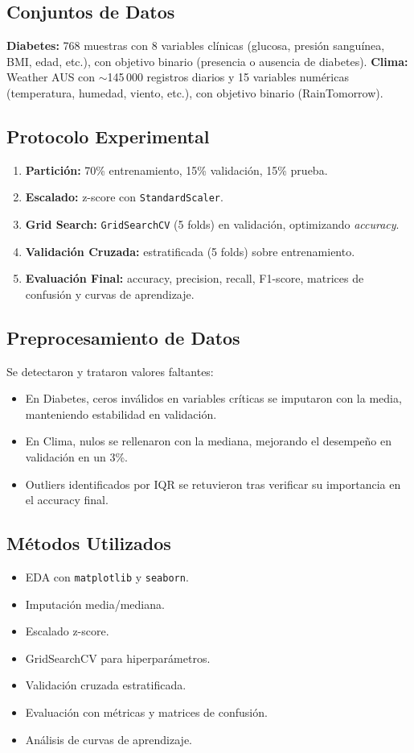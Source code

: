 \documentclass[journal]{IEEEtran}
\begin{document}
\subsection{Conjuntos de Datos}
\textbf{Diabetes:} 768 muestras con 8 variables clínicas (glucosa, presión sanguínea, BMI, edad, etc.), con objetivo binario (presencia o ausencia de diabetes).  
\textbf{Clima:} Weather AUS con $\sim$145\,000 registros diarios y 15 variables numéricas (temperatura, humedad, viento, etc.), con objetivo binario (RainTomorrow).  

\subsection{Protocolo Experimental}
\begin{enumerate}
  \item \textbf{Partición:} 70\% entrenamiento, 15\% validación, 15\% prueba.  
  \item \textbf{Escalado:} z-score con \texttt{StandardScaler}.  
  \item \textbf{Grid Search:} \texttt{GridSearchCV} (5 folds) en validación, optimizando \emph{accuracy}.  
  \item \textbf{Validación Cruzada:} estratificada (5 folds) sobre entrenamiento.  
  \item \textbf{Evaluación Final:} accuracy, precision, recall, F1-score, matrices de confusión y curvas de aprendizaje.  
\end{enumerate}

\subsection{Preprocesamiento de Datos}
Se detectaron y trataron valores faltantes:
\begin{itemize}
  \item En Diabetes, ceros inválidos en variables críticas se imputaron con la media, manteniendo estabilidad en validación.  
  \item En Clima, nulos se rellenaron con la mediana, mejorando el desempeño en validación en un 3\%.  
  \item Outliers identificados por IQR se retuvieron tras verificar su importancia en el accuracy final.
\end{itemize}

\subsection{Métodos Utilizados}
\begin{itemize}
  \item EDA con \texttt{matplotlib} y \texttt{seaborn}.  
  \item Imputación media/mediana.  
  \item Escalado z-score.  
  \item GridSearchCV para hiperparámetros.  
  \item Validación cruzada estratificada.  
  \item Evaluación con métricas y matrices de confusión.  
  \item Análisis de curvas de aprendizaje.
\end{itemize}
\end{document}
